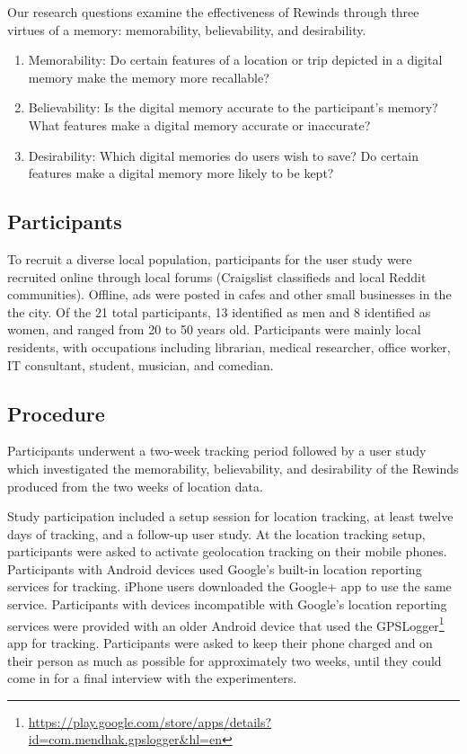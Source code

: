 \documentclass{sigchi}
\begin{document}
Our research questions examine the effectiveness of Rewinds through three virtues of a memory: memorability, believability, and desirability.

\begin{enumerate}
\item Memorability: Do certain features of a location or trip depicted in a digital memory make the memory more recallable? 
\item Believability:  Is the digital memory accurate to the participant's memory? What features make a digital memory accurate or inaccurate?
\item Desirability: Which digital memories do users wish to save? Do certain features make a digital memory more likely to be kept?
\end{enumerate}

\subsection{Participants}
To recruit a diverse local population, participants for the user study were recruited online through local forums (Craigslist classifieds and local Reddit communities). Offline, ads were posted in cafes and other small businesses in the the city. Of the 21 total participants, 13 identified as men and 8 identified as women, and ranged from 20 to 50 years old. Participants were mainly local residents, with occupations including librarian, medical researcher, office worker, IT consultant, student, musician, and comedian.

\subsection{Procedure}
Participants underwent a two-week tracking period followed by a user study which investigated the memorability, believability, and desirability of the Rewinds produced from the two weeks of location data.

Study participation included a setup session for location tracking, at least twelve days of tracking, and a follow-up user study. At the location tracking setup, participants were asked to activate geolocation tracking on their mobile phones. Participants with Android devices used Google's built-in location reporting services for tracking. iPhone users downloaded the Google+ app to use the same service. Participants with devices incompatible with Google's location reporting services were provided with an older Android device that used the GPSLogger\footnote{\url{https://play.google.com/store/apps/details?id=com.mendhak.gpslogger&hl=en}} app for tracking. Participants were asked to keep their phone charged and on their person as much as possible for approximately two weeks, until they could come in for a final interview with the experimenters.
\end{document}
